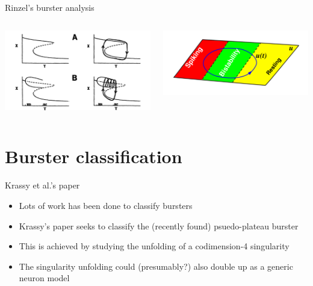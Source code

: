 \documentclass[,aspectratio=169]{beamer}
\begin{document}
\begin{frame}[label={sec:orgdf76c12}]{Rinzel's burster analysis}
\begin{columns}
\begin{column}{0.5\columnwidth}
\begin{center}
\includegraphics[width=\textwidth]{rinzburst.png}
\end{center}
\end{column}

\begin{column}{0.5\columnwidth}
\begin{center}
\includegraphics[width=\textwidth]{bursterschematic.png}
\end{center}
\end{column}
\end{columns}
\end{frame}


\section{Burster classification}
\label{sec:org7704b1a}
\begin{frame}[label={sec:org8456f49}]{Krassy et al.'s paper}
\begin{itemize}
\item Lots of work has been done to classify bursters
\item Krassy's paper seeks to classify the (recently found) psuedo-plateau burster
\item This is achieved by studying the unfolding of a codimension-4 singularity
\item The singularity unfolding could (presumably?) also double up as a generic neuron model
\end{itemize}
\end{frame}
\end{document}
